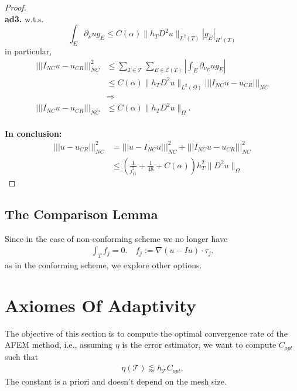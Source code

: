 \documentclass[a4paper,12pt,oneside,fleqn]{book}
\theoremstyle{definition}
\theoremstyle{remark}
\begin{document}
\begin{proof}
\quad\\
\textbf{ad3.} w.t.s. 
\begin{equation*}
	\int_E \partial_\nu u g_E \le C(\alpha) \|h_T D^2 u\|_{L^2(T)}|g_E|_{H^1(T)}
\end{equation*}
in particular, 
\begin{align*}
	||| I_{NC} u - u_{CR}|||_{NC}^2 &\le \sum_{T \in \mathcal{T}} \sum_{E \in \mathcal{E}(T)}|\int_E \partial_{\nu_E}u g_E|\\
	& \le C(\alpha)\|h_T D^2u\|_{L^2(\Omega)} |||I_{NC}u - u_{CR}|||_{NC}\\
	&\Rightarrow\\
	|||I_{NC} u - u_{CR}|||_{NC} &\le C(\alpha) \|h_T D^2 u\|_\Omega.
\end{align*}
\quad\\
\textbf{In conclusion:}
\begin{align*}
	||| u - u_{CR}|||_{NC}^2 &= |||u - I_{NC}u|||_{NC}^2 + |||I_{NC}u - u_{CR}|||^2_{NC}\\
	& \le (\frac{1}{j_{11}^2} + \frac{1}{48} + C(\alpha)) h_T^2 \|D^2u\|_\Omega
\end{align*}
\end{proof}

\subsection{The Comparison Lemma}
Since in the case of non-conforming scheme we no longer have 
\begin{align*}
	\int_T f_j = 0. \quad f_j:= \nabla(u - Iu) \cdot \tau_j.
\end{align*}
as in the conforming scheme, we explore other options. 


\section{Axiomes Of Adaptivity}
The objective of this section is to compute the optimal convergence rate of the AFEM method, i.e., assuming $\eta$ is the error estimator, we want to compute $C_{opt}$ such that 
\begin{align*}
	\eta(\mathcal{T}) \lessapprox h_{\mathcal{T}} C_{opt}. 
\end{align*}
The constant is a priori and doesn't depend on the mesh size. 
\end{document}
